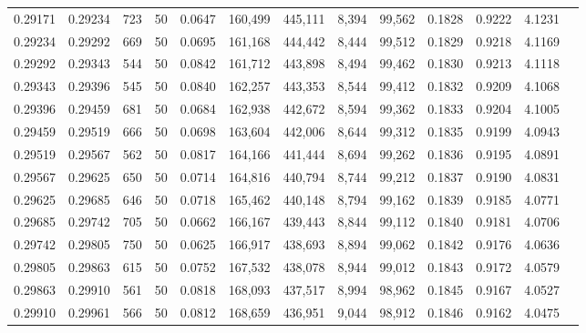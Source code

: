 \begin{tabular}{rrrrrrrrrrrrr}
0.29171 & 0.29234 &   723 &  50 &                                     0.0647 & 160,499 & 445,111 &   8,394 &  99,562 & 0.1828 & 0.9222 & 4.1231 \\
0.29234 & 0.29292 &   669 &  50 &                                     0.0695 & 161,168 & 444,442 &   8,444 &  99,512 & 0.1829 & 0.9218 & 4.1169 \\
0.29292 & 0.29343 &   544 &  50 &                                     0.0842 & 161,712 & 443,898 &   8,494 &  99,462 & 0.1830 & 0.9213 & 4.1118 \\
0.29343 & 0.29396 &   545 &  50 &                                     0.0840 & 162,257 & 443,353 &   8,544 &  99,412 & 0.1832 & 0.9209 & 4.1068 \\
0.29396 & 0.29459 &   681 &  50 &                                     0.0684 & 162,938 & 442,672 &   8,594 &  99,362 & 0.1833 & 0.9204 & 4.1005 \\
0.29459 & 0.29519 &   666 &  50 &                                     0.0698 & 163,604 & 442,006 &   8,644 &  99,312 & 0.1835 & 0.9199 & 4.0943 \\
0.29519 & 0.29567 &   562 &  50 &                                     0.0817 & 164,166 & 441,444 &   8,694 &  99,262 & 0.1836 & 0.9195 & 4.0891 \\
0.29567 & 0.29625 &   650 &  50 &                                     0.0714 & 164,816 & 440,794 &   8,744 &  99,212 & 0.1837 & 0.9190 & 4.0831 \\
0.29625 & 0.29685 &   646 &  50 &                                     0.0718 & 165,462 & 440,148 &   8,794 &  99,162 & 0.1839 & 0.9185 & 4.0771 \\
0.29685 & 0.29742 &   705 &  50 &                                     0.0662 & 166,167 & 439,443 &   8,844 &  99,112 & 0.1840 & 0.9181 & 4.0706 \\
0.29742 & 0.29805 &   750 &  50 &                                     0.0625 & 166,917 & 438,693 &   8,894 &  99,062 & 0.1842 & 0.9176 & 4.0636 \\
0.29805 & 0.29863 &   615 &  50 &                                     0.0752 & 167,532 & 438,078 &   8,944 &  99,012 & 0.1843 & 0.9172 & 4.0579 \\
0.29863 & 0.29910 &   561 &  50 &                                     0.0818 & 168,093 & 437,517 &   8,994 &  98,962 & 0.1845 & 0.9167 & 4.0527 \\
0.29910 & 0.29961 &   566 &  50 &                                     0.0812 & 168,659 & 436,951 &   9,044 &  98,912 & 0.1846 & 0.9162 & 4.0475 \\

\end{tabular}
